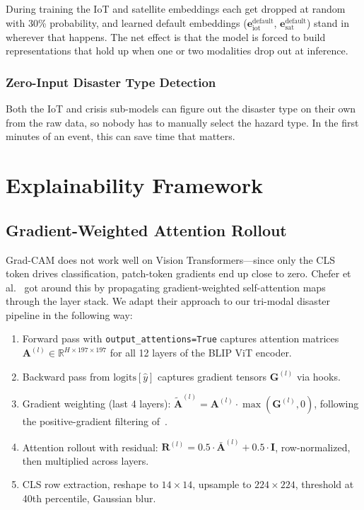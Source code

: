 \documentclass[journal]{IEEEtran}
\begin{document}
During training the IoT and satellite embeddings each get dropped at random with 30\% probability, and learned default embeddings ($\mathbf{e}_\text{iot}^\text{default}$, $\mathbf{e}_\text{sat}^\text{default}$) stand in wherever that happens. The net effect is that the model is forced to build representations that hold up when one or two modalities drop out at inference.

\subsubsection{Zero-Input Disaster Type Detection}

Both the IoT and crisis sub-models can figure out the disaster type on their own from the raw data, so nobody has to manually select the hazard type. In the first minutes of an event, this can save time that matters.

\section{Explainability Framework}

\subsection{Gradient-Weighted Attention Rollout}

Grad-CAM does not work well on Vision Transformers---since only the CLS token drives classification, patch-token gradients end up close to zero. Chefer et al.~\cite{chefer2021transformer} got around this by propagating gradient-weighted self-attention maps through the layer stack. We adapt their approach to our tri-modal disaster pipeline in the following way:

\begin{enumerate}
    \item Forward pass with \texttt{output\_attentions=True} captures attention matrices $\mathbf{A}^{(l)} \in \mathbb{R}^{H \times 197 \times 197}$ for all 12 layers of the BLIP ViT encoder.
    \item Backward pass from $\text{logits}[\hat{y}]$ captures gradient tensors $\mathbf{G}^{(l)}$ via hooks.
    \item Gradient weighting (last 4 layers): $\tilde{\mathbf{A}}^{(l)} = \mathbf{A}^{(l)} \cdot \max(\mathbf{G}^{(l)}, 0)$, following the positive-gradient filtering of~\cite{chefer2021transformer}.
    \item Attention rollout with residual: $\mathbf{R}^{(l)} = 0.5 \cdot \bar{\mathbf{A}}^{(l)} + 0.5 \cdot \mathbf{I}$, row-normalized, then multiplied across layers.
    \item CLS row extraction, reshape to $14 \times 14$, upsample to $224 \times 224$, threshold at 40th percentile, Gaussian blur.
\end{enumerate}
\end{document}
